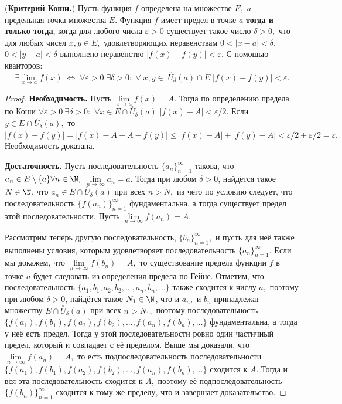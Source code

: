 \begin{theorem} (\textbf{Критерий Коши.})
    Пусть функция $f$ определена на множестве $E,$
    $a$ -- предельная точка множества $E.$
    Функция $f$ имеет предел в точке $a$
    \textbf{тогда и только тогда}, когда для любого
    числа $\varepsilon>0$ существует такое число
    $\delta>0,$ что для любых чисел $x, y \in E,$
    удовлетворяющих неравенствам $0<|x-a|<\delta,$
    $0<|y-a|<\delta$ выполнено неравенство $|f(x)-
    f(y)|<\varepsilon.$ С помощью кванторов:
    $$\exists \lim\limits_{x\rightarrow a}f(x)\;
    \Leftrightarrow\;\forall \varepsilon > 0\;
    \exists \delta >0 :\;\forall \;x, y \in\;
    \stackrel{\circ}{U}_{\delta}(a) \cap E\;
    |f(x) - f(y)| < \varepsilon.
    $$
    \end{theorem}
    \begin{proof}
    \textbf{Необходимость.}
    Пусть $\lim\limits_{x\rightarrow a}f(x)=A$.
    Тогда по определению
    предела по Коши $\forall\varepsilon>0  \ \exists\delta>0:$
    $\forall x \in E\cap\stackrel{\circ}{U}_{\delta}(a)$
    $|f(x)-A|<\varepsilon/2.$ Если $y \in
    E\cap\stackrel{\circ}{U}_{\delta}(a),$
    то $|f(x) - f(y)| = |f(x) - A + A -
    f(y)| \leq |f(x) - A| + |f(y) - A|
    < \varepsilon/2 + \varepsilon/2=\varepsilon.$
    Необходимость доказана.
    
    \textbf{Достаточность.}
    Пусть последовательность $\{a_n\}_{n=1}^{\infty}$
    такова, что
    $a_n \in E\setminus\{a\}\forall n \in \N,$
    $\lim\limits_{n\rightarrow\infty}a_n=a.$
    Тогда при любом $\delta>0$,
    найдётся такое $N \in \N$, что
    $a_n \in E\cap\stackrel{\circ}{U}_{\delta}(a)$
    при всех $n > N,$ из чего по условию следует, что
    последовательность $\{f(a_n)\}_{n=1}^{\infty}$
    фундаментальна, а тогда существует
    предел этой последовательности.
    Пусть $\lim\limits_{n\rightarrow\infty}f(a_n)=A.$
    
    Рассмотрим теперь другую последовательность,
    $\{b_n\}_{n=1}^{\infty},$
    и пусть для неё также выполнены условия, которым
    удовлетворяет последовательность
    $\{a_n\}_{n=1}^{\infty}.$ Если мы докажем, что
    $\lim\limits_{n\rightarrow\infty}f(b_n)=A,$
    то существование предела функции $f$ в точке
    $a$ будет следовать из определения предела
    по Гейне. Отметим, что последовательность
    $\{a_1, b_1, a_2, b_2, ..., a_n, b_n, ...\}$
    также сходится к числу $a,$ поэтому при любом
    $\delta>0$,
    найдётся такое $N_1 \in \N$, что и
    $a_n,$ и $b_n$ принадлежат множеству
    $E\cap\stackrel{\circ}{U}_{\delta}(a)$
    при всех $n > N_1,$ поэтому последовательность
    $\{f(a_1), f(b_1), f(a_2),
    f(b_2), ..., f(a_n), f(b_n), ...\}$
    фундаментальна, а тогда у неё есть предел.
    Тогда у этой последовательности ровно
    один частичный предел, который и совпадает
    с её пределом. Выше мы доказали, что
    $\lim\limits_{n\rightarrow\infty}f(a_n)=A,$
    то есть подпоследовательность
    последовательности $\{f(a_1), f(b_1), f(a_2),
    f(b_2), ..., f(a_n), f(b_n), \textrm{...}\}$
    сходится к $A.$ Тогда и вся
    эта последовательность сходится к $A,$
    поэтому её подпоследовательность
    $\{f(b_n)\}_{n=1}^{\infty}$ сходится к тому
    же пределу, что и завершает доказательство.
    \end{proof}


